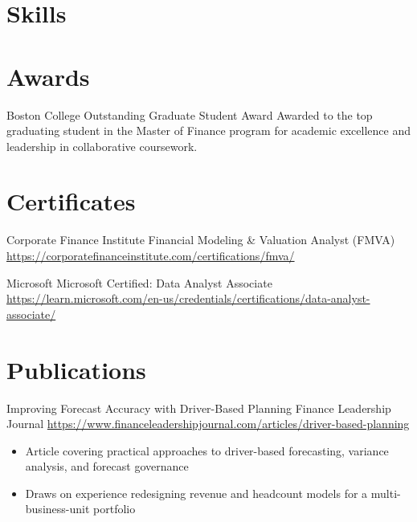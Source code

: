 \documentclass[a4paper, serif, 10pt]{moderncv}
\begin{document}
\section{Skills}

\section{Awards}

        {Boston College}
        {Outstanding Graduate Student Award}
        {}
        {}
        {Awarded to the top graduating student in the Master of Finance program for academic excellence and leadership in collaborative coursework.}
\section{Certificates}

        {Corporate Finance Institute}
        {Financial Modeling \& Valuation Analyst (FMVA)}
        {\url{https://corporatefinanceinstitute.com/certifications/fmva/}}
        {}
        {}

        {Microsoft}
        {Microsoft Certified: Data Analyst Associate}
        {\url{https://learn.microsoft.com/en-us/credentials/certifications/data-analyst-associate/}}
        {}
        {}
\section{Publications}

        {Improving Forecast Accuracy with Driver-Based Planning}
        {Finance Leadership Journal}
        {\url{https://www.financeleadershipjournal.com/articles/driver-based-planning}}
        {}
        {\begin{itemize}
\item Article covering practical approaches to driver-based forecasting, variance analysis, and forecast governance
\item Draws on experience redesigning revenue and headcount models for a multi-business-unit portfolio
\end{itemize}}
\end{document}
